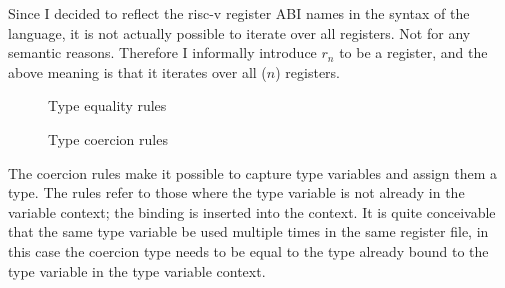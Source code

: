 Since I decided to reflect the risc-v register ABI names in the syntax of the
language, it is not actually possible to iterate over all registers. Not for
any semantic reasons. Therefore I informally introduce $r_n$ to be a register,
and the above meaning is that it iterates over all ($n$) registers.

\begin{figure}
    
    \caption{Type equality rules}
    \label{fig:type-eq-rules}
\end{figure}

\begin{figure}
    
    \caption{Type coercion rules}
    \label{fig:type-co-rules}
\end{figure}

The coercion rules make it possible to capture type variables and assign them a
type. The  rules refer to those where the type variable is
not already in the variable context; the binding is inserted into  the context.
It is quite conceivable that the same type variable be used multiple times in
the same register file, in this case the coercion type needs to be equal to the
type already bound to the type variable in the type variable context.

